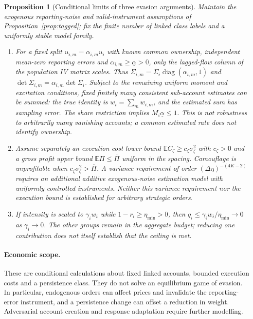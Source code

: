 \documentclass[12pt]{article}
\newtheorem{proposition}[theorem]{Proposition}
\theoremstyle{definition}
\theoremstyle{remark}
\begin{document}
\begin{proposition}[Conditional limits of three evasion arguments]\label{prop:strategic}
Maintain the exogenous reporting-noise and valid-instrument assumptions of Proposition~\ref{prop:tagged}; fix the finite number of linked class labels and a uniformly stable model family.
\begin{enumerate}[label=(\roman*)]
\item For a fixed split $u_{i,m}=\alpha_{i,m}u_i$ with known common ownership, independent mean-zero reporting errors and $\alpha_{i,m}\ge\underline\alpha>0$, only the lagged-flow column of the population IV matrix scales. Thus $\Sigma_{i,m}=\Sigma_i\operatorname{diag}(\alpha_{i,m},1)$ and $\det\Sigma_{i,m}=\alpha_{i,m}\det\Sigma_i$. Subject to the remaining uniform moment and excitation conditions, fixed finitely many consistent sub-account estimates can be summed: the true identity is $w_i=\sum_m w_{i,m}$, and the estimated sum has sampling error. The share restriction implies $M_i\underline\alpha\le1$. This is not robustness to arbitrarily many vanishing accounts; a common estimated rate does not identify ownership.
\item Assume separately an execution cost lower bound $\mathbb E C_\zeta\ge c_\zeta\sigma_\zeta^2$ with $c_\zeta>0$ and a gross profit upper bound $\mathbb E\Pi\le\overline\Pi$ uniform in the spacing. Camouflage is unprofitable when $c_\zeta\sigma_\zeta^2>\overline\Pi$. A variance requirement of order $(\Delta\eta)^{-(4K-2)}$ requires an additional additive exogenous-noise estimation model with uniformly controlled instruments. Neither this variance requirement nor the execution bound is established for arbitrary strategic orders.
\item If intensity is scaled to $\gamma_iw_i$ while $1-r_i\ge\eta_{\min}>0$, then $q_i\le\gamma_iw_i/\eta_{\min}\to0$ as $\gamma_i\to0$. The other groups remain in the aggregate budget; reducing one contribution does not itself establish that the ceiling is met.
\end{enumerate}
\end{proposition}

\paragraph{Economic scope.} These are conditional calculations about fixed linked accounts, bounded execution costs and a persistence class. They do not solve an equilibrium game of evasion. In particular, endogenous orders can affect prices and invalidate the reporting-error instrument, and a persistence change can offset a reduction in weight. Adversarial account creation and response adaptation require further modelling.
\end{document}
